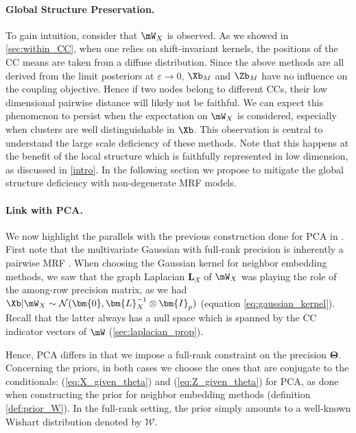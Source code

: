 \paragraph{Global Structure Preservation. }
To gain intuition, consider that $\mW_{X}$ is observed. As we showed in \cref{sec:within_CC}, when one relies on shift-invariant kernels, the positions of the CC means are taken from a diffuse distribution. Since the above methods are all derived from the limit posteriors at $\varepsilon \to 0$, $\Xb_{M}$ and $\Zb_{M}$ have no influence on the coupling objective. Hence if two nodes belong to different CCs, their low dimensional pairwise distance will likely not be faithful. We can expect this phenomenon to persist when the expectation on $\mW_{X}$ is considered, especially when clusters are well distinguishable in $\Xb$. This observation is central to understand the large scale deficiency of these methods. Note that this happens at the benefit of the local structure which is faithfully represented in low dimension, as discussed in \cref{intro}. In the following section we propose to mitigate the global structure deficiency with non-degenerate MRF models.

\paragraph{Link with PCA.} We now highlight the parallels with the previous construction done for PCA in . First note that the multivariate Gaussian with full-rank precision is inherently a pairwise MRF \citep{rue2005gaussian}. When choosing the Gaussian kernel for neighbor embedding methods, we saw that the graph Laplacian $\bm{L}_{X}$ of $\mW_{X}$ was playing the role of the among-row precision matrix, as we had $\Xb | \mW_{X} \sim \mathcal{N}(\bm{0}, \bm{L}_{X}^{-1} \otimes \bm{I}_p)$ (equation \ref{eq:gaussian_kernel}). Recall that the latter always has a null space which is spanned by the CC indicator vectors of $\mW$ (\cref{sec:laplacian_prop}). 

Hence, PCA differs in that we impose a full-rank constraint on the precision $\bm{\Theta}$. Concerning the priors, in both cases we choose the ones that are conjugate to the conditionals: (\ref{eq:X_given_theta}) and (\ref{eq:Z_given_theta}) for PCA, as done when constructing the prior for neighbor embedding methods (definition \ref{def:prior_W}). In the full-rank setting, the prior simply amounts to a well-known Wishart distribution denoted by $\mathcal{W}$. 


